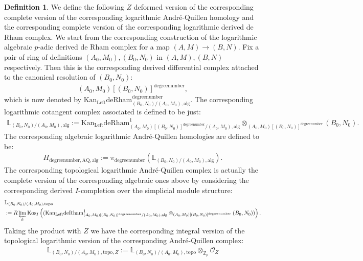 \documentclass[11pt]{book}
\theoremstyle{definition}
\newtheorem{definition}[theorem]{Definition}
\numberwithin{equation}{section}
\begin{document}
\begin{definition}
We define the following $Z$ deformed version of the corresponding complete version of the corresponding logarithmic Andr\'e-Quillen homology and the corresponding complete version of the corresponding logarithmic derived de Rham complex. We start from the corresponding construction of the logarithmic algebraic $p$-adic derived de Rham complex for a map $(A,M)\rightarrow (B,N)$. Fix a pair of ring of definitions $(A_0,M_0),(B_0,N_0)$ in $(A,M),(B,N)$ respectively. Then this is the corresponding derived differential complex attached to the canonical resolution of $(B_0,N_0)$:
\begin{align}
(A_0,M_0)[(B_0,N_0)]^\text{degreenumber},	
\end{align}
which is now denoted by $\mathrm{Kan}_\mathrm{Left}\mathrm{deRham}^\text{degreenumber}_{(B_0,N_0)/(A_0,M_0),\mathrm{alg}}$. The corresponding logarithmic cotangent complex associated is defined to be just:
\begin{align}
\mathbb{L}_{(B_0,N_0)/(A_0,M_0),\mathrm{alg}}:=	\mathrm{Kan}_\mathrm{Left}\mathrm{deRham}^1_{(A_0,M_0)[(B_0,N_0)]^\text{degreenumber}/(A_0,M_0),\mathrm{alg}}\otimes_{(A_0,M_0)[(B_0,N_0)]^\text{degreenumber}} (B_0,N_0).
\end{align}
The corresponding algebraic logarithmic Andr\'e-Quillen homologies are defined to be:
\begin{align}
H_{\text{degreenumber},{\mathrm{AQ}},\mathrm{alg}}:=\pi_\text{degreenumber} (\mathbb{L}_{(B_0,N_0)/(A_0,M_0),\mathrm{alg}}). 	
\end{align}
The corresponding topological logarithmic Andr\'e-Quillen complex is actually the complete version of the corresponding algebraic ones above by considering the corresponding derived $I$-completion over the simplicial module structure:
\begin{align}
&\mathbb{L}_{(B_0,N_0)/(A_0,M_0),\mathrm{topo}}\\
&:=R\varprojlim_k\mathrm{Kos}_I	\left((\mathrm{Kan}_\mathrm{Left}\mathrm{deRham}^1_{(A_0,M_0)[(B_0,N_0)]^\text{degreenumber}/(A_0,M_0),\mathrm{alg}}\otimes_{(A_0,M_0)[(B_0,N_0)]^\text{degreenumber}} (B_0,N_0))\right).
\end{align}
Taking the product with $Z$ we have the corresponding integral version of the topological logarithmic version of the corresponding Andr\'e-Quillen complex:
\begin{align}
\mathbb{L}_{(B_0,N_0)/(A_0,M_0),\mathrm{topo},Z}:=\mathbb{L}_{(B_0,N_0)/(A_0,M_0),\mathrm{topo}}{\otimes}_{\mathbb{Z}_p}\mathcal{O}_Z

\end{align}
\end{definition}
\end{document}
